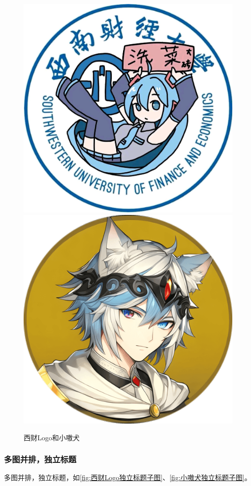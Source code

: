 \begin{figure}[htb]
\centering
\begin{minipage}{0.5\linewidth}
\centering
\includegraphics[width=0.45\linewidth]{img/swufe_logo.jpg}
\hfill
\includegraphics[width=0.45\linewidth]{img/小嗷犬.png}
\caption{西财Logo和小嗷犬}
\label{fig:西财Logo和小嗷犬}
\end{minipage}
\end{figure}

\subsubsection{多图并排，独立标题}

多图并排，独立标题，如\cref{fig:西财Logo独立标题子图}、\cref{fig:小嗷犬独立标题子图}。

